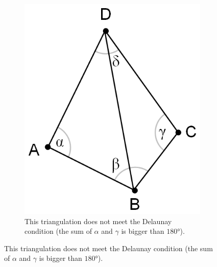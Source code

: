 \begin{figure}[htbp]
    \centering
    \newcommand*{\subfigwidth}{.8\linewidth}
    \begin{subfigure}[b]{\subfigwidth}
        \centering
        \includegraphics[width=\subfigwidth]{figures/appendix/Delaunay_geometry.png}
        \caption{This triangulation does not meet the Delaunay condition (the sum of \(\alpha\) and \(\gamma\) is bigger than \(\ang{180}\)).}\label{subfig:delauneymismatch}
    \end{subfigure}


\end{figure}

